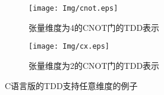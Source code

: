 \documentclass{article}
\begin{document}
\begin{itemize}[leftmargin=*]
\begin{itemize}
\begin{figure}[!htbp]
\begin{subfigure}[b]{.4\textwidth}
                \texttt{[image: Img/cnot.eps]}
                \caption{张量维度为4的CNOT门的TDD表示}
                \label{fig:cnot-4}
            \end{subfigure}
            \begin{subfigure}[b]{.4\textwidth}
                \centering
                \texttt{[image: Img/cx.eps]}
                \caption{张量维度为2的CNOT门的TDD表示}
                \label{fig:cnot-2}
            \end{subfigure}
            \caption{C语言版的TDD支持任意维度的例子}
            \label{fig-cnot}
        \end{figure}
    \end{itemize}
\end{itemize}
\end{document}

